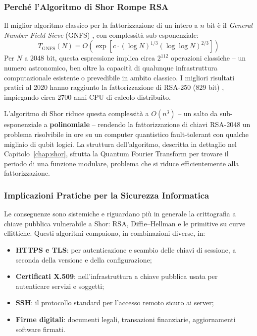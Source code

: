 \begin{onehalfspace}
\subsubsection{Perché l'Algoritmo di Shor Rompe RSA}

Il miglior algoritmo classico per la fattorizzazione di un intero a $n$ bit è il \textit{General Number Field Sieve} (GNFS) \cite{lenstra1993gnfs}, con complessità sub-esponenziale:
\begin{equation}
    T_{\text{GNFS}}(N) = O\!\left(\exp\!\left[c\cdot(\log N)^{1/3}(\log\log N)^{2/3}\right]\right)
    \label{eq:gnfs_complexity_intro}
\end{equation}
Per $N$ a 2048 bit, questa espressione implica circa $2^{112}$ operazioni classiche -- un numero astronomico, ben oltre la capacità di qualunque infrastruttura computazionale esistente o prevedibile in ambito classico. I migliori risultati pratici al 2020 hanno raggiunto la fattorizzazione di RSA-250 (829 bit) \cite{rsa250_2020}, impiegando circa 2700 anni-CPU di calcolo distribuito.

L'algoritmo di Shor riduce questa complessità a $O(n^3)$ -- un salto da sub-esponenziale a \textbf{polinomiale} -- rendendo la fattorizzazione di chiavi RSA-2048 un problema risolvibile in ore su un computer quantistico fault-tolerant con qualche migliaio di qubit logici. La struttura dell'algoritmo, descritta in dettaglio nel Capitolo~\ref{chap:shor}, sfrutta la Quantum Fourier Transform per trovare il periodo di una funzione modulare, problema che si riduce efficientemente alla fattorizzazione.

\clearpage
\subsubsection{Implicazioni Pratiche per la Sicurezza Informatica}

Le conseguenze sono sistemiche e riguardano più in generale la crittografia
a chiave pubblica vulnerabile a Shor: RSA, Diffie--Hellman e le primitive su
curve ellittiche. Questi algoritmi compaiono, in combinazioni diverse, in:

\begin{itemize}
    \item \textbf{HTTPS e TLS}: per autenticazione e scambio delle chiavi di sessione, a seconda della versione e della configurazione;
    \item \textbf{Certificati X.509}: nell'infrastruttura a chiave pubblica usata per autenticare servizi e soggetti;
    \item \textbf{SSH}: il protocollo standard per l'accesso remoto sicuro ai server;
    \item \textbf{Firme digitali}: documenti legali, transazioni finanziarie, aggiornamenti software firmati.
\end{itemize}


\end{onehalfspace}
